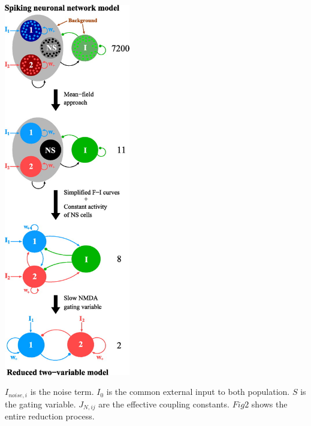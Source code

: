 \begin{multicols}{2}
\begin{center}
  \includegraphics[width=55mm,scale=0.1]{fig/Model.jpg}
  \label{fig: Reduction model}
\end{center}

$I_{noise,i}$ is the noise term. $I_{0}$ is the common external input to both population. $S$ is the gating variable. $J_{N,ij}$ are the effective coupling constants. $Fig 2$ shows the entire reduction process.
\end{multicols}












